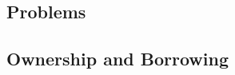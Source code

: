 \documentclass[%
final,
xcolor = table,
usenames,
dvipsnames,
table,
aspectratio = 169]{beamer}
\begin{document}
\subsection{Problems}


\subsection{Ownership and Borrowing}










% 


% 

% 

\end{document}
